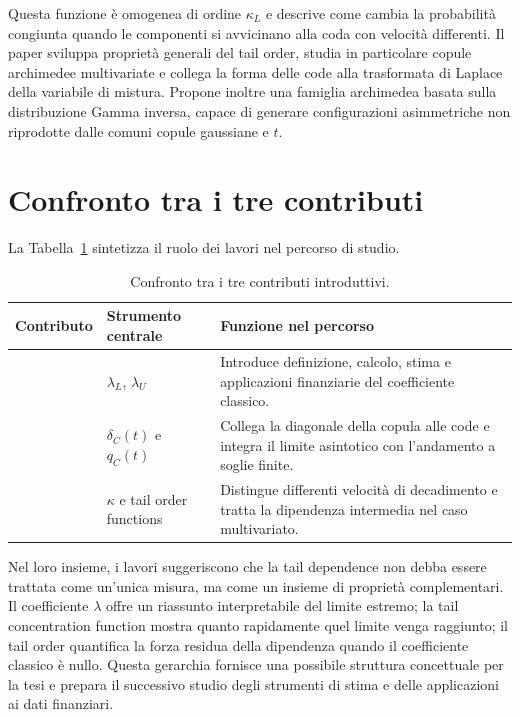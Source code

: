 \documentclass[12pt,a4paper,oneside]{book}
\begin{document}
Questa funzione è omogenea di ordine $\kappa_L$ e descrive come cambia la
probabilità congiunta quando le componenti si avvicinano alla coda con
velocità differenti. Il paper sviluppa proprietà generali del tail order,
studia in particolare copule archimedee multivariate e collega la forma delle
code alla trasformata di Laplace della variabile di mistura. Propone inoltre
una famiglia archimedea basata sulla distribuzione Gamma inversa, capace di
generare configurazioni asimmetriche non riprodotte dalle comuni copule
gaussiane e $t$.

\section{Confronto tra i tre contributi}

La Tabella~\ref{tab:confronto-paper} sintetizza il ruolo dei lavori nel
percorso di studio.

\begin{table}[htbp]
    \centering
    \caption{Confronto tra i tre contributi introduttivi.}
    \label{tab:confronto-paper}
    \begin{tabularx}{\textwidth}{%
        >{\raggedright\arraybackslash}p{}%
        >{\raggedright\arraybackslash}p{}%
        >{\raggedright\arraybackslash}X}
        \toprule
        Contributo & Strumento centrale & Funzione nel percorso \\
        \midrule
        \textcite{schmidt2005}
        & $\lambda_L$, $\lambda_U$
        & Introduce definizione, calcolo, stima e applicazioni finanziarie del
          coefficiente classico. \\
        \addlinespace
        \textcite{duranteEtAl2015}
        & $\delta_C(t)$ e $q_C(t)$
        & Collega la diagonale della copula alle code e integra il limite
          asintotico con l'andamento a soglie finite. \\
        \addlinespace
        \textcite{huaJoe2011}
        & $\kappa$ e tail order functions
        & Distingue differenti velocità di decadimento e tratta la dipendenza
          intermedia nel caso multivariato. \\
        \bottomrule
    \end{tabularx}
\end{table}

Nel loro insieme, i lavori suggeriscono che la tail dependence non debba
essere trattata come un'unica misura, ma come un insieme di proprietà
complementari. Il coefficiente $\lambda$ offre un riassunto interpretabile del
limite estremo; la tail concentration function mostra quanto rapidamente quel
limite venga raggiunto; il tail order quantifica la forza residua della
dipendenza quando il coefficiente classico è nullo. Questa gerarchia fornisce
una possibile struttura concettuale per la tesi e prepara il successivo studio
degli strumenti di stima e delle applicazioni ai dati finanziari.
\end{document}
